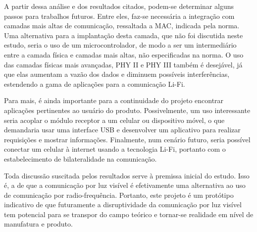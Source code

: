 	A partir dessa análise e dos resultados citados, podem-se determinar alguns passos para trabalhos futuros. Entre eles, faz-se necessária a integração com camadas mais altas de comunicação, ressaltada a MAC, indicada pela norma. Uma alternativa para a implantação desta camada, que não foi discutida neste estudo, seria o uso de um microcontrolador, de modo a ser um intermediário entre a camada física e camadas mais altas, não especificadas na norma. O uso das camadas físicas mais avançadas, PHY II e PHY III também é desejável, já que elas aumentam a vazão dos dados e diminuem possíveis interferências, estendendo a gama de aplicações para a comunicação Li-Fi.
	
	Para mais, é ainda importante para a continuidade do projeto encontrar aplicações pertinentes ao usuário do produto. Possivelmente, um uso interessante seria acoplar o módulo receptor a um celular ou dispositivo móvel, o que demandaria usar uma interface USB e desenvolver um aplicativo para realizar requisições e mostrar informações. Finalmente, num cenário futuro, seria possível conectar um celular à internet usando a tecnologia Li-Fi, portanto com o estabelecimento de bilateralidade na comunicação.
	
	Toda discussão suscitada pelos resultados serve à premissa inicial do estudo. Isso é, a de que a comunicação por luz visível é efetivamente uma alternativa ao uso de comunicação por radio-frequência. Portanto, este projeto é um protótipo indicativo de que futuramente a disruptividade da comunicação por luz visível tem potencial para se transpor do campo teórico e tornar-se realidade em nível de manufatura e produto. 